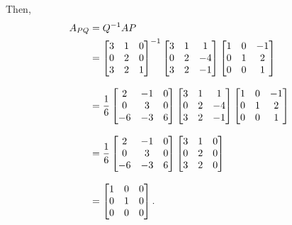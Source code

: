 \documentclass[../MathsNotesBase.tex]{subfiles}
\begin{document}
{\begin{exe}
{			Then,
			\begin{align*}
			A_{PQ} &= {Q}^{-1} A P \\
			&= 	{\begin{bmatrix}
					3 & 1 & 0\\
					0 & 2 & 0\\
					3 & 2 & 1
				\end{bmatrix}}^{-1}
				\begin{bmatrix}
					3 & 1 & 1  \\
					0 & 2 & -4 \\
					3 & 2 & -1
				\end{bmatrix}
				\begin{bmatrix}
					1 & 0 & -1  \\
					0 & 1 &  2 \\
					0 & 0 &  1
				\end{bmatrix} &\text{\scriptsize{}} \\[8pt]
			&= 	\frac{1}{6}
				\begin{bmatrix}
					2  & -1 & 0\\
					0  &  3 & 0\\
					-6 & -3 & 6
				\end{bmatrix}
				\begin{bmatrix}
					3 & 1 & 1  \\
					0 & 2 & -4 \\
					3 & 2 & -1
				\end{bmatrix}
				\begin{bmatrix}
					1 & 0 & -1  \\
					0 & 1 &  2 \\
					0 & 0 &  1
				\end{bmatrix} &\text{\scriptsize{}} \\[8pt]
			&= 	\frac{1}{6}
				\begin{bmatrix}
				2  & -1 & 0\\
				0  &  3 & 0\\
				-6 & -3 & 6
				\end{bmatrix}
				\begin{bmatrix}
				3 & 1 & 0 \\
				0 & 2 & 0 \\
				3 & 2 & 0
				\end{bmatrix} &\text{\scriptsize{}} \\[8pt]
			&= 	\begin{bmatrix}
					1 & 0 & 0\\
					0 & 1 & 0\\
					0 & 0 & 0
				\end{bmatrix}.
			\end{align*}
			}\label{ex:matrix-simplification-by-selecting-bases}
		\end{exe}
		
	}
\end{document}
